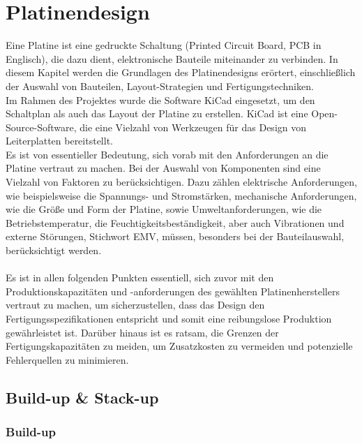 \chapter{Platinendesign}
\label{ch:platinendesign}
Eine Platine ist eine gedruckte Schaltung (Printed Circuit Board, PCB in Englisch), die dazu dient, elektronische Bauteile miteinander zu verbinden. In diesem Kapitel werden die Grundlagen des Platinendesigns erörtert, einschließlich der Auswahl von Bauteilen, Layout-Strategien und Fertigungstechniken.
\\
Im Rahmen des Projektes wurde die Software KiCad eingesetzt, um den Schaltplan als auch das Layout der Platine zu erstellen. KiCad ist eine Open-Source-Software, die eine Vielzahl von Werkzeugen für das Design von Leiterplatten bereitstellt.
\\
Es ist von essentieller Bedeutung, sich vorab mit den Anforderungen an die Platine vertraut zu machen. Bei der Auswahl von Komponenten sind eine Vielzahl von Faktoren zu berücksichtigen. Dazu zählen elektrische Anforderungen, wie beispielsweise die Spannungs- und Stromstärken, mechanische Anforderungen, wie die Größe und Form der Platine, sowie Umweltanforderungen, wie die Betriebstemperatur, die Feuchtigkeitsbeständigkeit, aber auch Vibrationen und externe Störungen, Stichwort EMV, müssen, besonders bei der Bauteilauswahl, berücksichtigt werden.
\\
\\
Es ist in allen folgenden Punkten essentiell, sich zuvor mit den Produktionskapazitäten und -anforderungen des gewählten Platinenherstellers vertraut zu machen, um sicherzustellen, dass das Design den Fertigungsspezifikationen entspricht und somit eine reibungslose Produktion gewährleistet ist.
Darüber hinaus ist es ratsam, die Grenzen der Fertigungskapazitäten zu meiden, um Zusatzkosten zu vermeiden und potenzielle Fehlerquellen zu minimieren.

\section{Build-up \& Stack-up}
\label{sec:buildup_stackup}
\subsection{Build-up}
\label{subsec:buildup}

